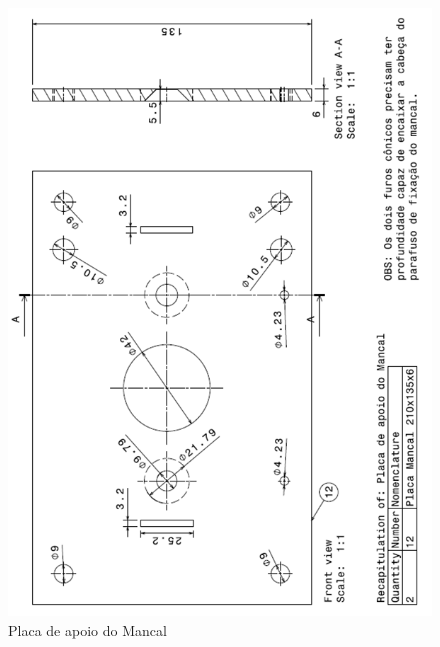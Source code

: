 \begin{anexosenv}
\begin{figure}[!ht]
	\centering
		\includegraphics[scale=0.6]{figuras/estrutura/anexos/12.png}
	\caption{Placa de apoio do Mancal}
\end{figure}


\end{anexosenv}
